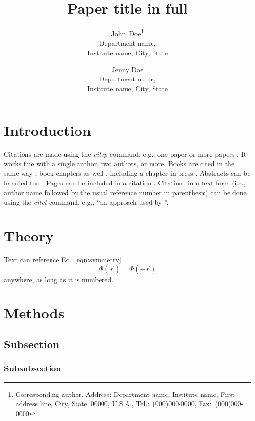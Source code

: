 \documentclass[11pt,titlepage]{article}
\title{Paper title in full}
\author{John~Doe\thanks{
           Corresponding author.  Address: 
           Department name,
	   Institute name,
	   First address line,
	   City, State~00000, U.S.A.,
	   Tel.:~(000)000-0000, Fax:~(000)000-0000} \\
	Department name, \\
	Institute name, City, State 
	\and Jenny Doe \\
	Department name, \\
	Institute name, City, State}
\date{}
\begin{document}
\maketitle


\clearpage

\section*{Introduction}

Citations are made using the \emph{citep} command, e.g., one paper
\citep{el-Kareh_etal93} or more papers
\citep{el-Kareh_etal93,Chen_Nicholson00}.  It works fine with a single
author, two authors, or more.  Books are cited in the same way
\citep{Callaghan91}, book chapters as well \citep{Stiles_Bartol01},
including a chapter in press \citep{Stiles_etal04}.  Abstracts can be
handled too \citep{Tao_etal02}.  Pages can be included in a citation
\citep[pp.~12--18]{Callaghan91}.  Citations in a text form (i.e., author 
name followed by the usual reference number in parenthesis) can be 
done using the \emph{citet} command, e.g., ``an approach used 
by \citet{el-Kareh_etal93}''.

\section*{Theory}

Text can reference Eq.~\ref{eqn:symmetry}
\begin{equation} \label{eqn:symmetry}
   \Phi(\vec{r}) = \Phi(-\vec{r})
\end{equation}
anywhere, as long as it is numbered.

\section*{Methods}

\subsection*{Subsection}

\subsubsection*{Subsubsection}
\end{document}
